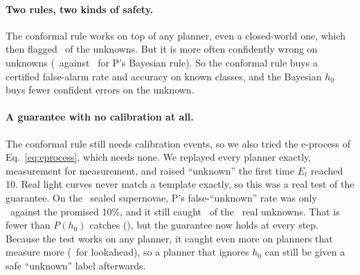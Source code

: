\paragraph{Two rules, two kinds of safety.} The conformal rule works on top of any planner, even a closed-world one, which then flagged \ConfFlagBthreeConf\ of the unknowns. But it is more often confidently wrong on unknowns (\ConfCwUnkCL\ against \ConfCwUnkP\ for P's Bayesian rule). So the conformal rule buys a certified false-alarm rate and accuracy on known classes, and the Bayesian $h_0$ buys fewer confident errors on the unknown.

\paragraph{A guarantee with no calibration at all.} The conformal rule still needs calibration events, so we also tried the e-process of Eq.~\eqref{eq:eprocess}, which needs none. We replayed every planner exactly, measurement for measurement, and raised ``unknown'' the first time $E_t$ reached 10. Real light curves never match a template exactly, so this was a real test of the guarantee. On the \EFreshN\ sealed supernovae, P's false-``unknown'' rate was only \EFreshFa\ against the promised 10\%, and it still caught \EDet\ of the \EWithheldN\ real unknowns. That is fewer than $P(h_0)$ catches (\RealCFlagP), but the guarantee now holds at every step. Because the test works on any planner, it caught even more on planners that measure more (\EDetL\ for lookahead), so a planner that ignores $h_0$ can still be given a safe ``unknown'' label afterwards.
